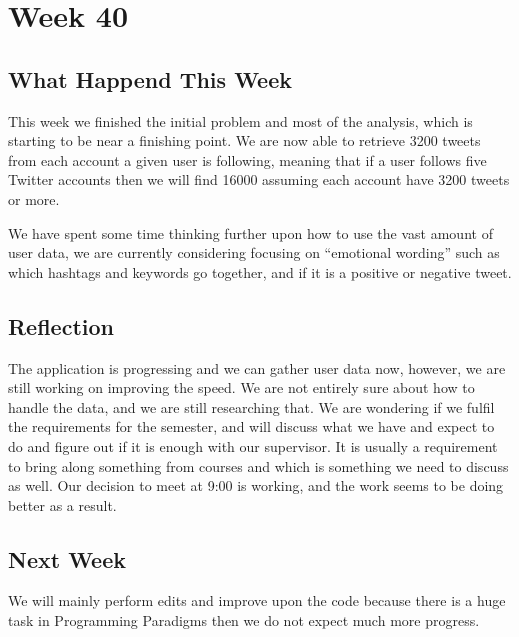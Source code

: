 \section*{Week 40}
\subsection*{What Happend This Week}
This week we finished the initial problem and most of the analysis, which is
starting to be near a finishing point. We are now able to retrieve 3200 tweets
from each account a given user is following, meaning that if a user follows five
Twitter accounts then we will find 16000 assuming each account have 3200 tweets
or more.

We have spent some time thinking further upon how to use the vast amount of user
data, we are currently considering focusing on ``emotional wording'' such as
which hashtags and keywords go together, and if it is a positive or negative
tweet.

\subsection*{Reflection} The application is progressing and we can gather user
data now, however, we are still working on improving the speed. We are not
entirely sure about how to handle the data, and we are still researching that.
We are wondering if we fulfil the requirements for the semester, and will
discuss what we have and expect to do and figure out if it is enough with our
supervisor. It is usually a requirement to bring along something from courses
and which is something we need to discuss as well. Our decision to meet at 9:00
is working, and the work seems to be doing better as a result.

\subsection*{Next Week} We will mainly perform edits and improve upon the code
because there is a huge task in Programming Paradigms then we do not expect much
more progress.




